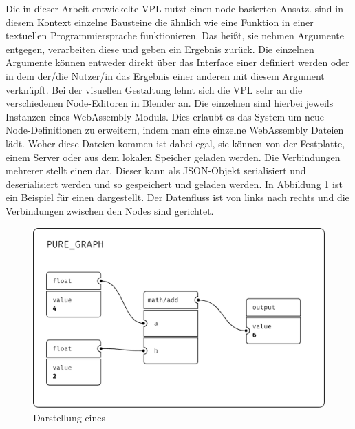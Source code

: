 \documentclass[ngerman]{article}
\begin{document}
Die in dieser Arbeit entwickelte VPL nutzt einen node-basierten Ansatz. 
 sind in diesem Kontext einzelne Bausteine die ähnlich wie eine Funktion in einer textuellen Programmiersprache funktionieren.
Das heißt, sie nehmen Argumente entgegen, verarbeiten diese und geben ein Ergebnis zurück.
\br
Die einzelnen Argumente können entweder direkt über das Interface einer  definiert werden oder in dem der/die Nutzer/in das Ergebnis einer anderen  mit diesem Argument verknüpft.
Bei der visuellen Gestaltung lehnt sich die VPL sehr an die verschiedenen Node-Editoren in Blender an.
\br
Die einzelnen  sind hierbei jeweils Instanzen eines WebAssembly-Moduls. 
Dies erlaubt es das System um neue Node-Definitionen zu erweitern, indem man eine einzelne WebAssembly Dateien lädt.
Woher diese Dateien kommen ist dabei egal, sie können von der Festplatte, einem Server oder aus dem lokalen Speicher geladen werden.
\br
Die Verbindungen mehrerer  stellt einen  dar. 
Dieser  kann als JSON-Objekt serialisiert und deserialisiert werden und so gespeichert und geladen werden.
\br
In Abbildung \ref{sec:PURE_GRAPH} ist ein Beispiel für einen  dargestellt. 
Der Datenfluss ist von links nach rechts und die Verbindungen zwischen den Nodes sind gerichtet.


\begin{figure}[htbp]
    \centering
    \begin{minipage}[b]{0.8\textwidth}
        \centering
        \includegraphics[width=\textwidth]{graphics/PURE_GRAPH.pdf}
        \caption{Darstellung eines }
        \label{sec:PURE_GRAPH}
    \end{minipage}
\end{figure}
\end{document}
